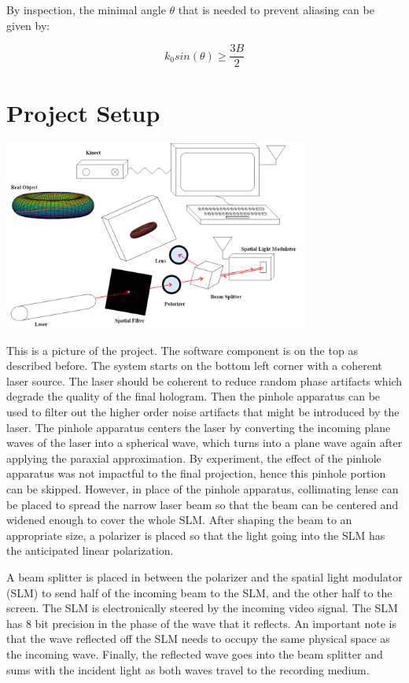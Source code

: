 \documentclass[12pt]{article}
\begin{document}
By inspection, the minimal angle \(\theta\) that is needed to prevent aliasing can be given by:

\begin{equation}
	k_{0}sin(\theta) \geq \frac{3B}{2}
\end{equation}

\section{Project Setup}

\begin{center}
\includegraphics[width=100mm]{tupac10.png}
\end{center}

This is a picture of the project. The software component is on the top as described before. The system starts on the bottom left corner with a coherent laser source. The laser should be coherent to reduce random phase artifacts which degrade the quality of the final hologram. Then the pinhole apparatus can be used to filter out the higher order noise artifacts that might be introduced by the laser. The pinhole apparatus centers the laser by converting the incoming plane waves of the laser into a spherical wave, which turns into a plane wave again after applying the paraxial approximation. By experiment, the effect of the pinhole apparatus was not impactful to the final projection, hence this pinhole portion can be skipped. However, in place of the pinhole apparatus, collimating lense can be placed to spread the narrow laser beam so that the beam can be centered and widened enough to cover the whole SLM. After shaping the beam to an appropriate size, a polarizer is placed so that the light going into the SLM has the anticipated linear polarization.

A beam splitter is placed in between the polarizer and the spatial light modulator (SLM) to send half of the incoming beam to the SLM, and the other half to the screen. The SLM is electronically steered by the incoming video signal. The SLM has 8 bit precision in the phase of the wave that it reflects. An important note is that the wave reflected off the SLM needs to occupy the same physical space as the incoming wave. Finally, the reflected wave goes into the beam splitter and sums with the incident light as both waves travel to the recording medium.
\end{document}
